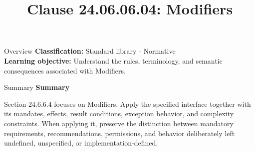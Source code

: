 \documentclass[10pt,letterpaper]{article}
\title{Clause 24.06.06.04: Modifiers}
\author{}
\date{}
\begin{document}
\maketitle
\begin{CornellOverviewBox}{Overview}
\textbf{Classification:} Standard library - Normative\\[2pt]
\textbf{Learning objective:} Understand the rules, terminology, and semantic consequences associated with Modifiers.
\end{CornellOverviewBox}\begin{CornellSummaryBox}{Summary}
{\sffamily\bfseries\color{Accent} Summary}\par\vspace{3pt}Section 24.6.6.4 focuses on Modifiers. Apply the specified interface together with its mandates, effects, result conditions, exception behavior, and complexity constraints. When applying it, preserve the distinction between mandatory requirements, recommendations, permissions, and behavior deliberately left undefined, unspecified, or implementation-defined.
\end{CornellSummaryBox}
\end{document}
